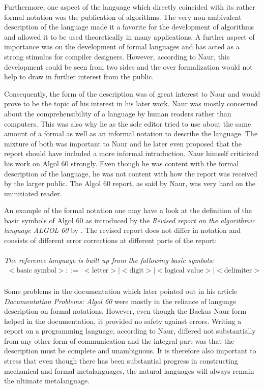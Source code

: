 \documentclass{article}
\begin{document}
Furthermore, one aspect of the language which directly coincided with its rather formal notation was the publication of algorithms. The very non-ambivalent description of the language made it a favorite for the development of algorithms and allowed it to be used theoretically in many applications. A further aspect of importance was on the development of formal languages and has acted as a strong stimulus for compiler designers. However, according to Naur, this development could be seen from two sides and the over formalization would not help to draw in further interest from the public.

Consequently, the form of the description was of great interest to Naur and would prove to be the topic of his interest in his later work. Naur was mostly concerned about the comprehensibility of a language by human readers rather than computers. This was also why he as the sole editor tried to use about the same amount of a formal as well as an informal notation to describe the language. The mixture of both was important to Naur and he later even proposed that the report should have included a more informal introduction. Naur himself criticized his work on Algol 60 strongly. Even though he was content with the formal description of the language, he was not content with how the report was received by the larger public. The Algol 60 report, as said by Naur, was very hard on the uninitiated reader.

An example of the formal notation one may have a look at the definition of the basic symbols of Algol 60 as introduced by the \textit{Revised report on the algorithmic language ALGOL 60} by \cite{Backus1963RevisedRO}. The revised report does not differ in notation and consists of different error corrections at different parts of the report:
\\ \\
\textit{The reference language is built up from the following basic symbols:}
\begin{equation} \label{eq5}
\begin{split}
<\text{basic symbol}> ::=&<\text{letter}>|<\text{digit}>|<\text{logical value}>|<\text{delimiter}> \\
\end{split}
\end{equation}

Some problems in the documentation which \citet{naur1963documentation} later pointed out in his article \textit{Documentation Problems: Algol 60} were mostly in the reliance of language description on formal notations. However, even though the Backus Naur form helped in the documentation, it provided no safety against errors. Writing a report on a programming language, according to Naur, differed not substantially from any other form of communication and the integral part was that the description must be complete and unambiguous. It is therefore also important to stress that even though there has been substantial progress in constructing mechanical and formal metalanguages, the natural languages will always remain the ultimate metalanguage.
\end{document}
